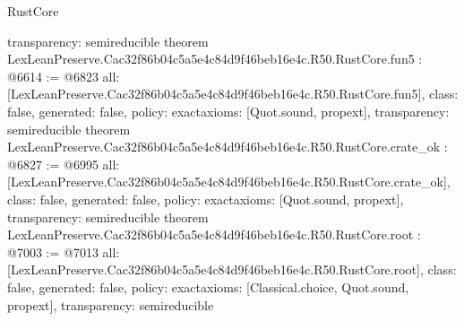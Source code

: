\begin{lexlean}{RustCore}
\begin{coremodule}
{  transparency: semireducible
}
theorem LexLeanPreserve.Cac32f86b04c5a5e4c84d9f46beb16e4c.R50.RustCore.fun5 : @6614 := @6823 {
  all: [LexLeanPreserve.Cac32f86b04c5a5e4c84d9f46beb16e4c.R50.RustCore.fun5],
  class: false,
  generated: false,
  policy: exact{axioms: [Quot.sound, propext]},
  transparency: semireducible
}
theorem LexLeanPreserve.Cac32f86b04c5a5e4c84d9f46beb16e4c.R50.RustCore.crate_ok : @6827 := @6995 {
  all: [LexLeanPreserve.Cac32f86b04c5a5e4c84d9f46beb16e4c.R50.RustCore.crate_ok],
  class: false,
  generated: false,
  policy: exact{axioms: [Quot.sound, propext]},
  transparency: semireducible
}
theorem LexLeanPreserve.Cac32f86b04c5a5e4c84d9f46beb16e4c.R50.RustCore.root : @7003 := @7013 {
  all: [LexLeanPreserve.Cac32f86b04c5a5e4c84d9f46beb16e4c.R50.RustCore.root],
  class: false,
  generated: false,
  policy: exact{axioms: [Classical.choice, Quot.sound, propext]},
  transparency: semireducible
}


\end{coremodule}
\end{lexlean}
